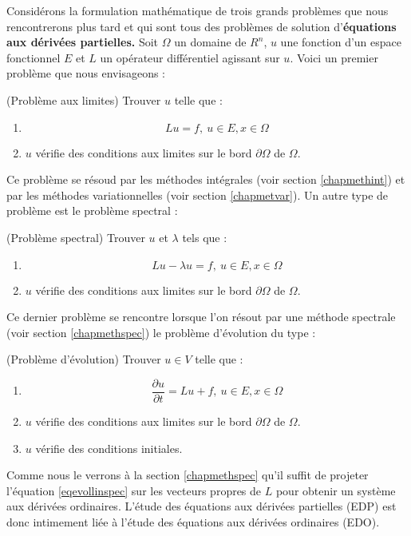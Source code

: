 \documentclass[12pt]{book}
\begin{document}
Consid\'erons la formulation math\'ematique de trois grands probl\`emes
que nous rencontrerons plus tard et qui sont tous des probl\`emes de solution
d'{\bf \'equations aux d\'eriv\'ees partielles.}
Soit $\Omega$ un domaine de $R^n$, $u$ une fonction d'un espace fonctionnel
$E$ et $L$ un 
op\'erateur diff\'erentiel agissant sur $u$. Voici un premier probl\`eme que
nous envisageons :
\begin{prob}\label{proeq}(Probl\`eme aux limites) 
Trouver $u$ telle que :
\begin{enumerate}
\item 
\begin{equation}
Lu=f,\ u\in E, x\in\Omega
\end{equation}
\item $u$ v\'erifie des conditions aux limites  sur le bord
$\partial 
\Omega$ de $\Omega$.
\end{enumerate}
\end{prob}
Ce probl\`eme se r\'esoud par les m\'ethodes int\'egrales (voir section
\ref{chapmethint})  et par les m\'ethodes variationnelles (voir section
\ref{chapmetvar}).
Un autre type de probl\`eme est le probl\`eme spectral :
\begin{prob}\label{prospec1} (Probl\`eme spectral)
Trouver $u$ et $\lambda$ tels que :
\begin{enumerate}
\item 
\begin{equation}
Lu-\lambda u=f,\ u\in E, x\in\Omega
\end{equation}
\item $u$ v\'erifie des conditions aux limites sur le bord $\partial
\Omega$ de $\Omega$.
\end{enumerate}
\end{prob}
Ce dernier probl\`eme se rencontre lorsque l'on r\'esout par une
m\'ethode spectrale (voir section \ref{chapmethspec}) le probl\`eme
d'\'evolution du type : 
\begin{prob}\label{probevollin}(Probl\`eme d'\'evolution)
Trouver $u\in V$ telle que :
\begin{enumerate}
\item 
\begin{equation}\label{eqevollinspec}
\frac{\partial u}{\partial t}=Lu+f,\ u\in E, x\in\Omega
\end{equation}
\item $u$ v\'erifie des conditions aux limites sur le bord
$\partial 
\Omega$ de $\Omega$.
\item $u$ v\'erifie des conditions initiales.
\end{enumerate}
\end{prob}
\begin{rem}
Comme nous le verrons \`a la section \ref{chapmethspec} qu'il
suffit de projeter l'\'equation \ref{eqevollinspec} sur les vecteurs
propres de $L$ pour obtenir un syst\`eme aux d\'eriv\'ees ordinaires.
L'\'etude des \'equations aux d\'eriv\'ees partielles (EDP) est
donc intimement li\'ee \`a l'\'etude des \'equations aux d\'eriv\'ees
ordinaires (EDO).
\end{rem}
\end{document}
